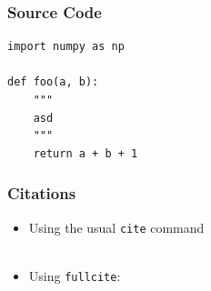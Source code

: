\documentclass[aspectratio=1610]{beamer}
\begin{document}
\begin{frame}[fragile]
    \frametitle{Source Code}

\begin{verbatim}
import numpy as np

def foo(a, b):
    """
    asd
    """
    return a + b + 1
\end{verbatim}

\end{frame}

\begin{frame}
    \frametitle{Citations}

    \begin{itemize}
        \item Using the usual \texttt{cite} command \cite{debus2023reporting}\\~

        \item Using \texttt{fullcite}:
    \end{itemize}

    \vspace{1em}
\end{frame}


\newcommand\crule[3][black]{\textcolor{#1}{\rule{#2}{#3}}}
\end{document}
